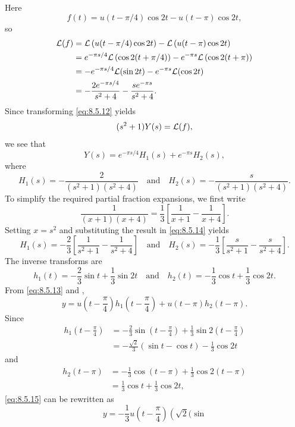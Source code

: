 \begin{solution}
Here
\[
f(t)=u(t-\pi/4)\cos2t-u(t-\pi)\cos2t,
\]
so
\begin{align*}
{\mathcal L}(f)
&={\mathcal L}\left(u(t-\pi/4)\cos2t\right)-{\mathcal L}\left(u(t-\pi)\cos2t\right)\\
&=e^{-{\pi s/4}}{\mathcal L}\left(\cos2(t+\pi/4)\right)
-e^{-\pi s}{\mathcal L}\left(\cos2(t+\pi)\right)\\
&=-e^{-{\pi s/4}}{\mathcal L}(\sin2t)-e^{-\pi s}{\mathcal L}(\cos2t)\\
&=-\frac{2e^{-{\pi s/ 4}}}{s^2+4}-\frac{se^{-\pi s}}{s^2+4}.
\end{align*}
Since transforming  \eqref{eq:8.5.12} yields
\[
(s^2+1)Y(s)={\mathcal L}(f),
\]
we see that
\begin{equation}\label{eq:8.5.13}
Y(s)=e^{-{\pi s/ 4}} H_1(s)+e^{-\pi s} H_2(s),
\end{equation}
where
\begin{equation}\label{eq:8.5.14}
H_1(s)=-\frac{2}{(s^2+1)(s^2+4)}\quad\text{and}\quad H_2(s)=-\frac{s}{
(s^2+1)(s^2+4)}.
\end{equation}
To simplify the required partial fraction expansions, we first write
\[
\frac{1}{(x+1)(x+4)}=\frac{1}{3}\left[\frac{1}{x+1}-\frac{1}{x+4}\right].
\]
Setting $x=s^2$ and substituting the result in  \eqref{eq:8.5.14} yields
\[
H_1(s)=-\frac{2}{3}\left[\frac{1}{s^2+1}-\frac{1}{s^2+4}\right]
\quad\text{and}\quad
H_2(s)=-\frac{1}{3}\left[\frac{s}{s^2+1}-\frac{s}{s^2+4}\right].
\]
The inverse transforms are
\[
h_1(t)=-\frac{2}{3}\sin t+\frac{1}{3}\sin2t
\quad\text{and}\quad
h_2(t)=-\frac{1}{3}\cos t+\frac{1}{3}\cos2t.
\]
From  \eqref{eq:8.5.13} and ,
\begin{equation}\label{eq:8.5.15}
y=u\left(t-\frac{\pi}{4}\right) h_1\left(t-\frac{\pi}{4}\right)+
u(t-\pi) h_2(t-\pi).
\end{equation}
Since
\begin{align*}
h_1\left(t-\frac{\pi}{4}\right)
&=-\frac{2}{3}\sin\left(t-\frac{\pi}{4}\right)
+\frac{1}{3}\sin2\left(t-\frac{\pi}{4}\right)\\
&=-\frac{\sqrt{2}}{3} (\sin t-\cos t)-\frac{1}{3}\cos2t
\end{align*}
and
\begin{align*}
h_2(t-\pi)
&=-\frac{1}{3}\cos (t-\pi)+\frac{1}{3}\cos2(t-\pi)\\
&=\frac{1}{3}\cos t+\frac{1}{3}\cos2t,
\end{align*}
\eqref{eq:8.5.15} can be rewritten as
\[
y=-\frac{1}{3}u\left(t-\frac{\pi}{4}\right)\left(\sqrt{2}(\sin
\]
\end{solution}
